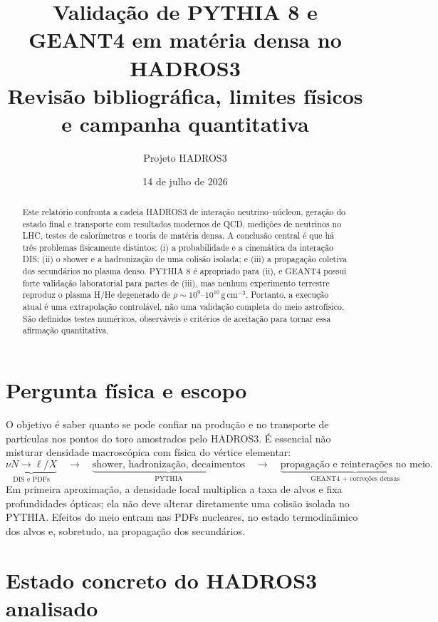 \documentclass[11pt,a4paper]{article}
\title{Validação de PYTHIA 8 e GEANT4 em matéria densa no HADROS3\\
\large Revisão bibliográfica, limites físicos e campanha quantitativa}
\author{Projeto HADROS3}
\date{14 de julho de 2026}
\begin{document}
\maketitle

\begin{abstract}
Este relatório confronta a cadeia HADROS3 de interação neutrino--núcleon,
geração do estado final e transporte com resultados modernos de QCD,
medições de neutrinos no LHC, testes de calorímetros e teoria de matéria
densa. A conclusão central é que há três problemas fisicamente distintos:
(i) a probabilidade e a cinemática da interação DIS; (ii) o shower e a
hadronização de uma colisão isolada; e (iii) a propagação coletiva dos
secundários no plasma denso. PYTHIA 8 é apropriado para (ii), e GEANT4 possui
forte validação laboratorial para partes de (iii), mas nenhum experimento
terrestre reproduz o plasma H/He degenerado de
$\rho\sim10^9$--$10^{10}\,\mathrm{g\,cm^{-3}}$. Portanto, a execução atual é
uma extrapolação controlável, não uma validação completa do meio
astrofísico. São definidos testes numéricos, observáveis e critérios de
aceitação para tornar essa afirmação quantitativa.
\end{abstract}

\tableofcontents

\section{Pergunta física e escopo}

O objetivo é saber quanto se pode confiar na produção e no transporte de
partículas nos pontos do toro amostrados pelo HADROS3. É essencial não
misturar densidade macroscópica com física do vértice elementar:
{\small\begin{equation}
\underbrace{\nu N\rightarrow \ell/X}_{\text{DIS e PDFs}}
\quad\longrightarrow\quad
\underbrace{\text{shower, hadronização, decaimentos}}_{\text{PYTHIA}}
\quad\longrightarrow\quad
\underbrace{\text{propagação e reinterações no meio}}_{\text{GEANT4 + correções densas}}.
\end{equation}}
Em primeira aproximação, a densidade local multiplica a taxa de alvos e
fixa profundidades ópticas; ela não deve alterar diretamente uma colisão
isolada no PYTHIA. Efeitos do meio entram nas PDFs nucleares, no estado
termodinâmico dos alvos e, sobretudo, na propagação dos secundários.

\section{Estado concreto do HADROS3 analisado}
\end{document}
